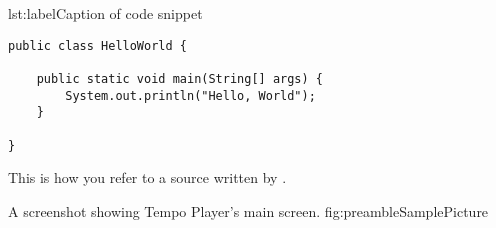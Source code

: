 


\begin{code}{lst:label}{Caption of code snippet}
\begin{lstlisting}
public class HelloWorld {

    public static void main(String[] args) {
        System.out.println("Hello, World");
    }

}
\end{lstlisting}
\end{code}

This is how you refer to a source written by \citet{musicRunEffectArticle}.

{A screenshot showing Tempo Player's main screen.} %
{fig:preambleSamplePicture} %